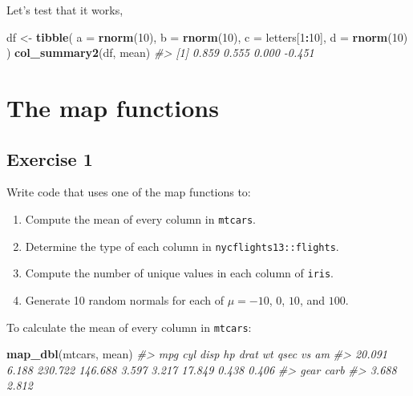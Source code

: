\documentclass[]{book}
\newenvironment{Shaded}{\begin{snugshade}}{\end{snugshade}}
\newcommand{\CommentTok}[1]{\textcolor[rgb]{0.56,0.35,0.01}{\textit{#1}}}
\newcommand{\DataTypeTok}[1]{\textcolor[rgb]{0.13,0.29,0.53}{#1}}
\newcommand{\DecValTok}[1]{\textcolor[rgb]{0.00,0.00,0.81}{#1}}
\newcommand{\KeywordTok}[1]{\textcolor[rgb]{0.13,0.29,0.53}{\textbf{#1}}}
\newcommand{\NormalTok}[1]{#1}
\newcommand{\OperatorTok}[1]{\textcolor[rgb]{0.81,0.36,0.00}{\textbf{#1}}}
\newcommand{\StringTok}[1]{\textcolor[rgb]{0.31,0.60,0.02}{#1}}
\providecommand{\tightlist}{%
  \setlength{\itemsep}{0pt}\setlength{\parskip}{0pt}}
\theoremstyle{definition}
\theoremstyle{definition}
\theoremstyle{definition}
\theoremstyle{remark}
\begin{document}
Let's test that it works,

\begin{Shaded}
\begin{Highlighting}[]
\NormalTok{df <-}\StringTok{ }\KeywordTok{tibble}\NormalTok{(}
  \DataTypeTok{a =} \KeywordTok{rnorm}\NormalTok{(}\DecValTok{10}\NormalTok{),}
  \DataTypeTok{b =} \KeywordTok{rnorm}\NormalTok{(}\DecValTok{10}\NormalTok{),}
  \DataTypeTok{c =}\NormalTok{ letters[}\DecValTok{1}\OperatorTok{:}\DecValTok{10}\NormalTok{],}
  \DataTypeTok{d =} \KeywordTok{rnorm}\NormalTok{(}\DecValTok{10}\NormalTok{)}
\NormalTok{)}
\KeywordTok{col_summary2}\NormalTok{(df, mean)}
\CommentTok{#> [1]  0.859  0.555  0.000 -0.451}
\end{Highlighting}
\end{Shaded}

\hypertarget{the-map-functions}{%
\section{The map functions}\label{the-map-functions}}

\hypertarget{exercise-1-55}{%
\subsection{Exercise 1}\label{exercise-1-55}}

Write code that uses one of the map functions to:

\begin{enumerate}
\def\labelenumi{\arabic{enumi}.}
\tightlist
\item
  Compute the mean of every column in \texttt{mtcars}.
\item
  Determine the type of each column in \texttt{nycflights13::flights}.
\item
  Compute the number of unique values in each column of \texttt{iris}.
\item
  Generate 10 random normals for each of \(\mu = -10\), \(0\), \(10\),
  and \(100\).
\end{enumerate}

To calculate the mean of every column in \texttt{mtcars}:

\begin{Shaded}
\begin{Highlighting}[]
\KeywordTok{map_dbl}\NormalTok{(mtcars, mean)}
\CommentTok{#>     mpg     cyl    disp      hp    drat      wt    qsec      vs      am }
\CommentTok{#>  20.091   6.188 230.722 146.688   3.597   3.217  17.849   0.438   0.406 }
\CommentTok{#>    gear    carb }
\CommentTok{#>   3.688   2.812}
\end{Highlighting}
\end{Shaded}
\end{document}

